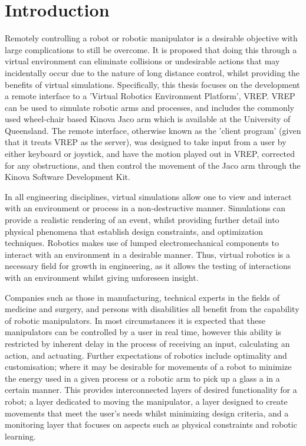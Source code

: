 \documentclass[12pt,openany,a4paper]{book}
\begin{document}
\chapter{Introduction}
Remotely controlling a robot or robotic manipulator is a desirable objective with large complications to still be overcome. It is proposed that doing this through a virtual environment can eliminate collisions or undesirable actions that may incidentally occur due to the nature of long distance control, whilst providing the benefits of virtual simulations. Specifically, this thesis focuses on the development a remote interface to a 'Virtual Robotics Environment Platform', VREP. VREP can be used to simulate robotic arms and processes, and includes the commonly used wheel-chair based Kinova Jaco arm which is available at the University of Queensland. The remote interface, otherwise known as the 'client program' (given that it treats VREP as the server), was designed to take input from a user by either keyboard or joystick, and have the motion played out in VREP, corrected for any obstructions, and then control the movement of the Jaco arm through the Kinova Software Development Kit.

In all engineering disciplines, virtual simulations allow one to view and interact with an environment or process in a non-destructive manner. Simulations can provide a realistic rendering of an event, whilst providing further detail into physical phenomena that establish design constraints, and optimization techniques. Robotics makes use of lumped electromechanical components to interact with an environment in a desirable manner. Thus, virtual robotics is a necessary field for growth in engineering, as it allows the testing of interactions with an environment whilst giving unforeseen insight.

Companies such as those in manufacturing, technical experts in the fields of medicine and surgery, and persons with disabilities all benefit from the capability of robotic manipulators. In most circumstances it is expected that these manipulators can be controlled by a user in real time, however this ability is restricted by inherent delay in the process of receiving an input, calculating an action, and actuating. Further expectations of robotics include optimality and customisation; where it may be desirable for movements of a robot to minimize the energy used in a given process or a robotic arm to pick up a glass a in a certain manner. This provides interconnected layers of desired functionality for a robot; a layer dedicated to moving the manipulator, a layer designed to create movements that meet the user's needs whilst minimizing design criteria, and a monitoring layer that focuses on aspects such as physical constraints and robotic learning.
\end{document}
